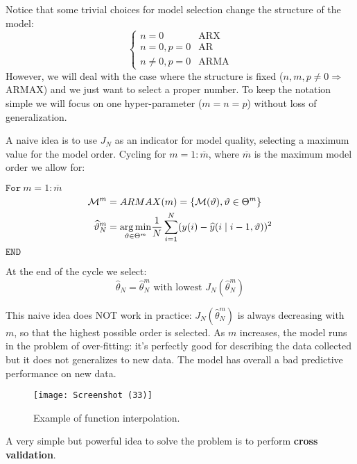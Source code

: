 Notice that some trivial choices for model selection change the structure of the model:
\begin{equation*}
\begin{cases}
n=0 & \text{ARX}\\
n=0,p=0 & \text{AR}\\
n\neq 0,p=0 & \text{ARMA}
\end{cases}
\end{equation*}
However, we will deal with the case where the structure is fixed ($ n,m,p\neq 0\Longrightarrow$ ARMAX) and we just want to select a proper number. To keep the notation simple we will focus on one hyper-parameter ($ m=n=p$) without loss of generalization.

A naive idea is to use $ J_{N}$ as an indicator for model quality, selecting a maximum value for the model order. Cycling for $ m=1:\overline{m}$, where $\overline{m}$ is the maximum model order we allow for:

$ \mathtt{For }\ m=1:\overline{m}$
\begin{equation*}
\begin{aligned}
\mathcal{M}^{m} & =ARMAX(m) =\left\{\mathcal{M}(\vartheta) ,\vartheta \in \Theta ^{m}\right\}\\
\widehat{\vartheta }_{N}^{m} & =\underset{\vartheta \in \Theta ^{m}}{\operatorname*{arg\,min}}\frac{1}{N}\sum _{i=1}^{N}(y(i) -\widehat{y}(i\mid i-1,\vartheta))^{2}
\end{aligned}
\end{equation*}
$ \mathtt{END}$

At the end of the cycle we select:
\begin{equation*}
\hat{\theta }_{N} =\hat{\theta }_{N}^{m} \text{ with lowest } J_{N}\left(\hat{\theta }_{N}^{m}\right)
\end{equation*}
\begin{obs}
	This naive idea does NOT work in practice: $ J_{N}\left(\hat{\theta }_{N}^{m}\right)$ is always decreasing with $ m$, so that the highest possible order is selected. As $m$ increases, the model runs in the problem of over-fitting: it's perfectly good for describing the data collected but it does not generalizes to new data. The model has overall a bad predictive performance on new data.
\end{obs}
\begin{figure}[htpb]
    \centering
    \texttt{[image: Screenshot (33)]}
    \caption{Example of function interpolation.}
\end{figure}
\FloatBarrier
A very simple but powerful idea to solve the problem is to perform \textbf{cross validation}.

